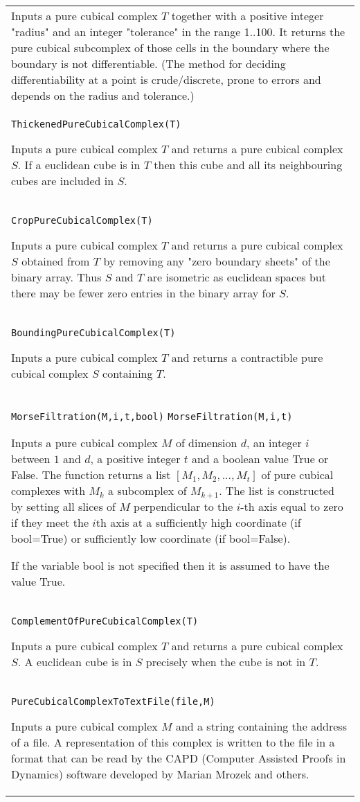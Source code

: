 \documentclass[a4paper,11pt]{report}
\begin{document}
{\begin{center}
\begin{tabular}{|l|}
 Inputs a pure cubical complex $T$ together with a positive integer "radius" and an integer "tolerance" in the
range 1..100. It returns the pure cubical subcomplex of those cells in the
boundary where the boundary is not differentiable. (The method for deciding
differentiability at a point is crude/discrete, prone to errors and depends on
the radius and tolerance.) \\
 \index{ThickenedPureCubicalComplex} \texttt{ThickenedPureCubicalComplex(T)} 

 Inputs a pure cubical complex $T$ and returns a pure cubical complex $S$. If a euclidean cube is in $T$ then this cube and all its neighbouring cubes are included in $S$. \\
 \index{CropPureCubicalComplex} \texttt{CropPureCubicalComplex(T)} 

 Inputs a pure cubical complex $T$ and returns a pure cubical complex $S$ obtained from $T$ by removing any "zero boundary sheets" of the binary array. Thus $S$ and $T$ are isometric as euclidean spaces but there may be fewer zero entries in the
binary array for $S$. \\
 \index{BoundingPureCubicalComplex} \texttt{BoundingPureCubicalComplex(T)} 

 Inputs a pure cubical complex $T$ and returns a contractible pure cubical complex $S$ containing $T$. \\
 \index{MorseFiltration} \texttt{MorseFiltration(M,i,t,bool)} \texttt{MorseFiltration(M,i,t)} 

 Inputs a pure cubical complex $M$ of dimension $d$, an integer $i$ between $1$ and $d$, a positive integer $t$ and a boolean value True or False. The function returns a list $[M_1, M_2, ..., M_t]$ of pure cubical complexes with $M_k$ a subcomplex of $M_{k+1}$. The list is constructed by setting all slices of $M$ perpendicular to the $i$-th axis equal to zero if they meet the $i$th axis at a sufficiently high coordinate (if bool=True) or sufficiently low
coordinate (if bool=False). 

 If the variable bool is not specified then it is assumed to have the value
True. \\
 \index{ComplementOfPureCubicalComplex} \texttt{ComplementOfPureCubicalComplex(T)} 

 Inputs a pure cubical complex $T$ and returns a pure cubical complex $S$. A euclidean cube is in $S$ precisely when the cube is not in $T$. \\
 \index{PureCubicalComplexToTextFile} \texttt{PureCubicalComplexToTextFile(file,M)} 

 Inputs a pure cubical complex $M$ and a string containing the address of a file. A representation of this
complex is written to the file in a format that can be read by the CAPD
(Computer Assisted Proofs in Dynamics) software developed by Marian Mrozek and
others. \\
\end{tabular}\\[2mm]
\end{center}

 }
\end{document}
